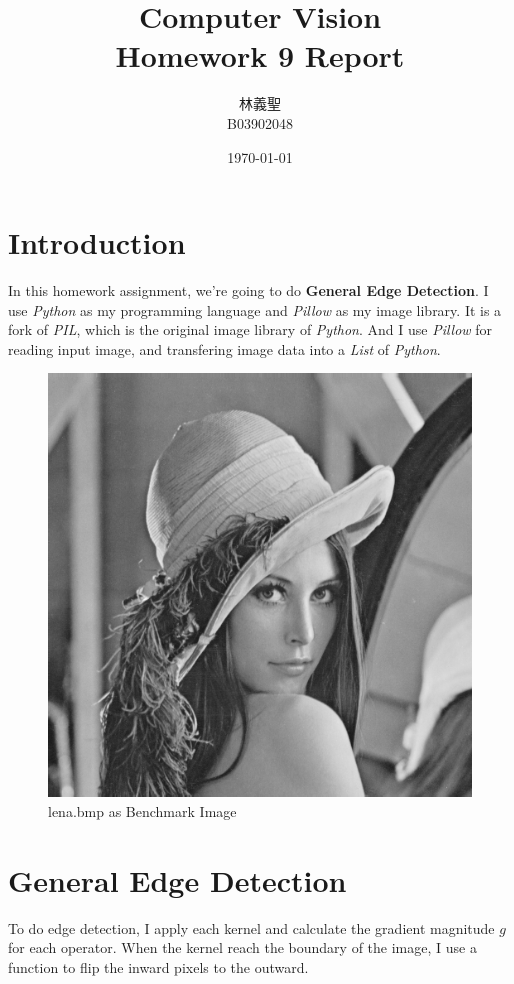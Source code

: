 \documentclass[14pt,a4paper]{extarticle}
\title{{\optima Computer Vision\\Homework 9 Report}}
\author{林義聖\\B03902048}
\date{\today}
\begin{document}
\maketitle
\thispagestyle{fancy}

\section{Introduction}

In this homework assignment, we're going to do \textbf{General Edge Detection}. I use \textit{Python} as my programming language and \textit{Pillow} as my image library. It is a fork of \textit{PIL}, which is the original image library of \textit{Python}. And I use \textit{Pillow} for reading input image, and transfering image data into a \textit{List} of \textit{Python}.

\begin{figure}[H]
\centering
\includegraphics[scale=0.5]{lena.bmp}
\caption{lena.bmp as Benchmark Image}
\label{fig:lena.bmp}
\end{figure}

\section{General Edge Detection}

To do edge detection, I apply each kernel and calculate the gradient magnitude $g$ for each operator. When the kernel reach the boundary of the image, I use a function to flip the inward pixels to the outward.
\end{document}
